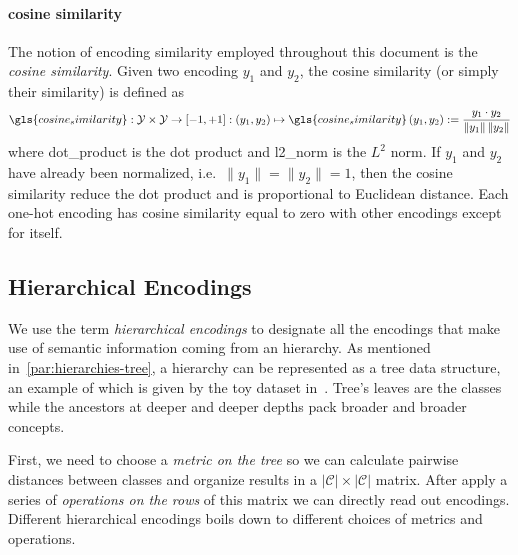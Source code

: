 \paragraph{cosine similarity} The notion of encoding similarity employed
throughout this document is the \emph{cosine similarity}. Given two encoding $y_1$ and $y_2$, the cosine similarity (or simply their similarity) is defined as
\begin{equation}
  \gls{cosine_similarity}: \mathcal{Y} \times \mathcal{Y} \to \left[-1, +1\right]
  : (y_1, y_2) \mapsto \gls{cosine_similarity} \,(y_1, y_2) :=
  \frac{y_1 \cdot y_2}{\|y_1\| \, \|y_2\|}
  \label{eq:cosine-simiarity}
\end{equation}
where \gls{dot_product} is the dot product and \gls{l2_norm} is the $L^2$ norm.
If $y_1$ and $y_2$ have already been normalized, i.e.\ $\|y_1\| = \|y_2\| = 1$, then the cosine similarity reduce the dot product and is proportional to Euclidean distance. Each one-hot encoding has cosine similarity equal to zero with other encodings except for itself.


\subsection{Hierarchical Encodings}
\label{subsec:hierarchical-encodings}

We use the term \emph{hierarchical encodings} to designate all the encodings that make use of semantic information coming from an hierarchy. As mentioned in~\cref{par:hierarchies-tree}, a hierarchy can be represented as a tree data structure, an example of which is given by the toy dataset in~. Tree's leaves are the classes while the ancestors at deeper and deeper depths pack broader and broader concepts.

First, we need to choose a \emph{metric on the tree} so we can calculate pairwise distances between classes and organize results in a $|\mathcal{C}| \times |\mathcal{C}|$ matrix. After apply a series of \emph{operations on the rows} of this matrix we can directly read out encodings. Different hierarchical encodings boils down to different choices of metrics and operations.

